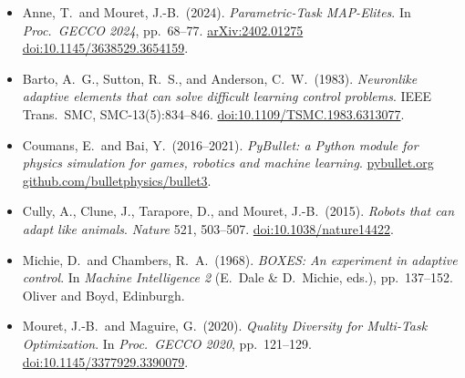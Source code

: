 \documentclass[11pt,a4paper]{article}
\begin{document}
\begin{itemize}\small
    \item Anne, T.\ and Mouret, J.-B.\ (2024).
    \emph{Parametric-Task MAP-Elites}. In \emph{Proc.\ GECCO 2024},
    pp.~68--77.
    \href{https://arxiv.org/abs/2402.01275}{arXiv:2402.01275} \textbullet{}
    \href{https://doi.org/10.1145/3638529.3654159}
    {doi:10.1145/3638529.3654159}.
    \item Barto, A.~G., Sutton, R.~S., and Anderson, C.~W.\ (1983).
    \emph{Neuronlike adaptive elements that can solve difficult learning
    control problems}. IEEE Trans.\ SMC, SMC-13(5):834--846.
    \href{https://doi.org/10.1109/TSMC.1983.6313077}
    {doi:10.1109/TSMC.1983.6313077}.
    \item Coumans, E.\ and Bai, Y.\ (2016--2021).
    \emph{PyBullet: a Python module for physics simulation for games,
    robotics and machine learning}.
    \href{https://pybullet.org}{pybullet.org} \textbullet{}
    \href{https://github.com/bulletphysics/bullet3}
    {github.com/bulletphysics/bullet3}.
    \item Cully, A., Clune, J., Tarapore, D., and Mouret, J.-B.\ (2015).
    \emph{Robots that can adapt like animals}. \emph{Nature} 521,
    503--507.
    \href{https://doi.org/10.1038/nature14422}
    {doi:10.1038/nature14422}.
    \item Michie, D.\ and Chambers, R.~A.\ (1968). \emph{BOXES: An
    experiment in adaptive control}. In \emph{Machine Intelligence 2}
    (E.\ Dale \& D.\ Michie, eds.), pp.~137--152. Oliver and Boyd,
    Edinburgh.
    \item Mouret, J.-B.\ and Maguire, G.\ (2020).
    \emph{Quality Diversity for Multi-Task Optimization}. In
    \emph{Proc.\ GECCO 2020}, pp.~121--129.
    \href{https://doi.org/10.1145/3377929.3390079}
    {doi:10.1145/3377929.3390079}.
\end{itemize}
\end{document}
